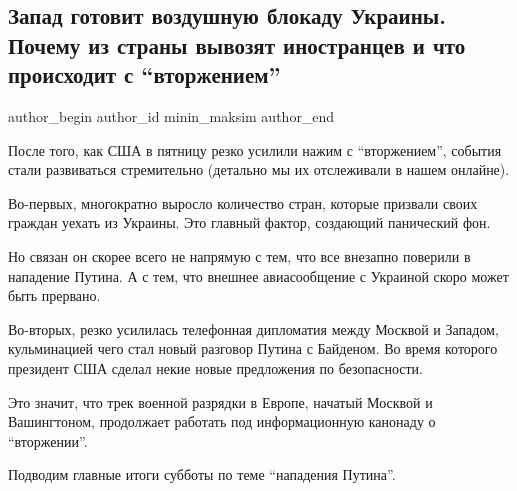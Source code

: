  
 
 
 
 
 
\subsection{Запад готовит воздушную блокаду Украины. Почему из страны вывозят иностранцев и что происходит с \enquote{вторжением}}
\label{sec:13_02_2022.stz.news.ua.strana.1.vozduh_blokada}
 
\ifcmt
 author_begin
   author_id minin_maksim
 author_end
\fi

После того, как США в пятницу резко усилили нажим с \enquote{вторжением}, события стали
развиваться стремительно (детально мы их отслеживали в нашем онлайне).

Во-первых, многократно выросло количество стран, которые призвали своих граждан
уехать из Украины. Это главный фактор, создающий панический фон. 


Но связан он скорее всего не напрямую с тем, что все внезапно поверили в
нападение Путина. А с тем, что внешнее авиасообщение с Украиной скоро может
быть прервано. 

Во-вторых, резко усилилась телефонная дипломатия между Москвой и Западом,
кульминацией чего стал новый разговор Путина с Байденом. Во время которого
президент США сделал некие новые предложения по безопасности.

Это значит, что трек военной разрядки в Европе, начатый Москвой и Вашингтоном,
продолжает работать под информационную канонаду о \enquote{вторжении}. 

Подводим главные итоги субботы по теме \enquote{нападения Путина}.





